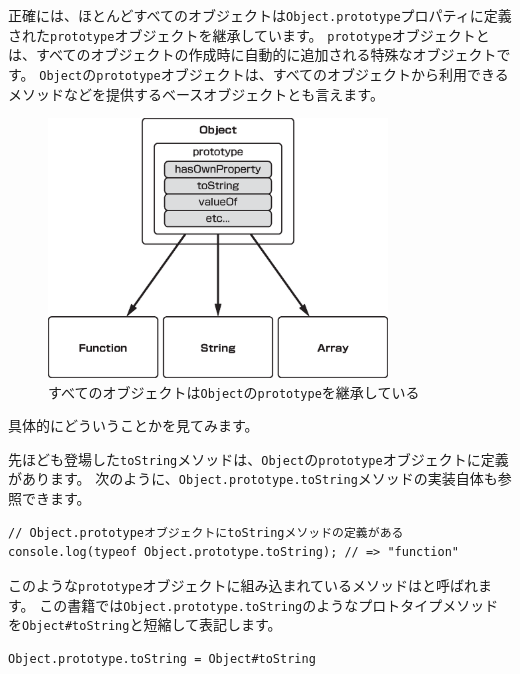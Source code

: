正確には、ほとんどすべてのオブジェクトは\texttt{Object.prototype}プロパティに定義された\texttt{prototype}オブジェクトを継承しています。
\texttt{prototype}オブジェクトとは、すべてのオブジェクトの作成時に自動的に追加される特殊なオブジェクトです。
\texttt{Object}の\texttt{prototype}オブジェクトは、すべてのオブジェクトから利用できるメソッドなどを提供するベースオブジェクトとも言えます。
\newpage
\begin{figure}[h]
\centering
\includegraphics[width=90mm]{./fig/object-prototype.eps}
\caption{すべてのオブジェクトは\texttt{Object}の\texttt{prototype}を継承している}
\end{figure}

具体的にどういうことかを見てみます。

先ほども登場した\texttt{toString}メソッドは、\texttt{Object}の\texttt{prototype}オブジェクトに定義があります。
次のように、\texttt{Object.prototype.toString}メソッドの実装自体も参照できます。

\begin{lstlisting}
// Object.prototypeオブジェクトにtoStringメソッドの定義がある
console.log(typeof Object.prototype.toString); // => "function"
\end{lstlisting}

このような\texttt{prototype}オブジェクトに組み込まれているメソッドは\textbf{}と呼ばれます。
この書籍では\texttt{Object.prototype.toString}のようなプロトタイプメソッドを\texttt{Object\#toString}と短縮して表記します。

\begin{lstlisting}
Object.prototype.toString = Object#toString
\end{lstlisting}


